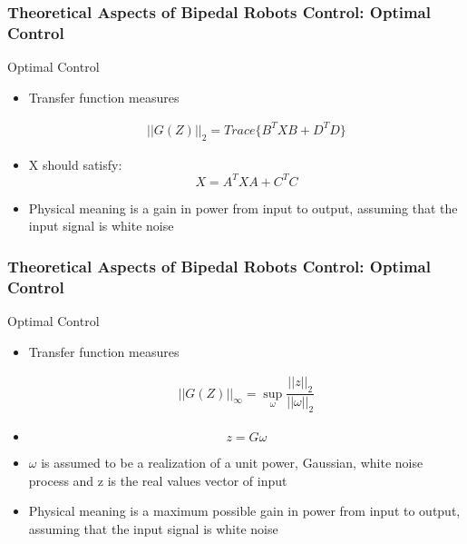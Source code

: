 \documentclass{beamer}
\begin{document}
	
	\begin{frame}
		\frametitle{Theoretical Aspects of Bipedal Robots Control: Optimal Control}
		\begin{block}{Optimal Control}
			\begin{itemize}
				\item
				Transfer function measures
				
				\begin{equation}
				\begin{split}
				||G(Z)||_2 = Trace\{ B^{T} XB + D^{T} D \}
				\end{split}
				\end{equation}
				\item
				X should satisfy:
				\begin{equation}
				X = A^TXA + C^TC
				\end{equation}
				\item
				Physical meaning is a gain in power from input to output, assuming that the input signal is white noise
			\end{itemize}
		\end{block}
	\end{frame}
	
	
	\begin{frame}
		\frametitle{Theoretical Aspects of Bipedal Robots Control: Optimal Control}
		\begin{block}{Optimal Control}
			\begin{itemize}
				\item
				Transfer function measures
				
				\begin{equation}
				\begin{split}
				||G(Z)||_\infty = \sup_{\omega} \dfrac{||z||_2}{||\omega||_2}
				\end{split}
				\end{equation}
				\item
				\begin{equation}
				z  =G \omega
				\end{equation}
				\item
				$\omega$ is assumed to be a realization of a unit power, Gaussian, white noise
				process and z is the real values vector of input
				\item
				Physical meaning is a maximum possible gain in power from input to output, assuming that the input signal is white noise
			\end{itemize}
		\end{block}
	\end{frame}
	
\end{document}
